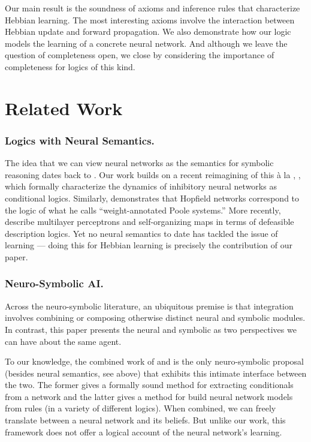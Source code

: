 \documentclass[letterpaper]{article}
\theoremstyle{definition}
\begin{document}
Our main result is the soundness of axioms and inference rules that characterize Hebbian learning.  The most interesting axioms involve the interaction between Hebbian update and forward propagation.  We also demonstrate how our logic models the learning of a concrete neural network. And although we leave the question of completeness open, we close by considering the importance of completeness for logics of this kind.

\section{Related Work}

\subsubsection{Logics with Neural Semantics.}
The idea that we can view neural networks as the semantics for symbolic reasoning dates back to \cite{mcculloch1943logical}.  Our work builds on a recent reimagining of this \`a la \cite{balkenius1991nonmonotonic}, \cite{leitgeb2001nonmonotonic,leitgeb2003nonmonotonic,leitgeb2018neural}, which formally characterize the dynamics of inhibitory neural networks as conditional logics.  Similarly, \cite{blutner2004nonmonotonic} demonstrates that Hopfield networks correspond to the logic of what he calls ``weight-annotated Poole systems.''  More recently, \cite{giordano2021} describe multilayer perceptrons and self-organizing maps in terms of defeasible description logics.  Yet no neural semantics to date has tackled the issue of learning --- doing this for Hebbian learning is precisely the contribution of our paper.

\subsubsection{Neuro-Symbolic AI.}
Across the neuro-symbolic literature, an ubiquitous premise is that integration involves combining or composing otherwise distinct neural and symbolic modules.  In contrast, this paper presents the neural and symbolic as two perspectives we can have about the same agent.

To our knowledge, the combined work of \cite{garcez2001symbolic} and \cite{garcez2008neural} is the only neuro-symbolic proposal (besides neural semantics, see above) that exhibits this intimate interface between the two.  The former gives a formally sound method for extracting conditionals from a network and the latter gives a method for build neural network models from rules (in a variety of different logics).  When combined, we can freely translate between a neural network and its beliefs.  But unlike our work, this framework does not offer a logical account of the neural network's learning.
\end{document}

